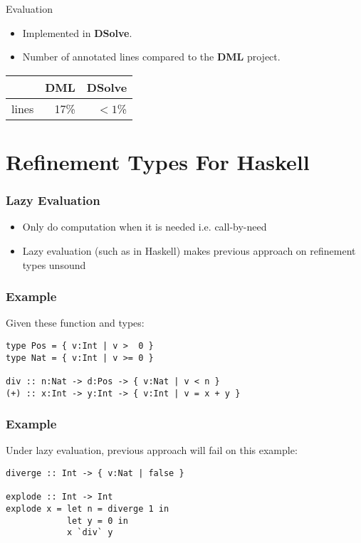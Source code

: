 \documentclass[pdf]{beamer}
\begin{document}
\begin{frame}{Evaluation}
  \begin{itemize}
    \item Implemented in \textbf{DSolve}.
    \item Number of annotated lines compared to the \textbf{DML} project.
  \end{itemize}
  \begin{table}
    \begin{tabular}{l|r|r}
            & \textbf{DML} & \textbf{DSolve}\\
      \hline
      lines & 17\%         & $< 1$\%
    \end{tabular}
  \end{table}
\end{frame}

\section{Refinement Types For Haskell}

\begin{frame}
  \frametitle{Lazy Evaluation}
  \begin{itemize}
    \item Only do computation when it is needed i.e. call-by-need
    \item Lazy evaluation (such as in Haskell) makes previous approach on
      refinement types unsound
  \end{itemize}
\end{frame}

\begin{frame}[fragile]
  \frametitle{Example}
  Given these function and types:
  \begin{verbatim}
type Pos = { v:Int | v >  0 }
type Nat = { v:Int | v >= 0 }

div :: n:Nat -> d:Pos -> { v:Nat | v < n } 
(+) :: x:Int -> y:Int -> { v:Int | v = x + y }
  \end{verbatim}
\end{frame}

\begin{frame}[fragile]
  \frametitle{Example}
  Under lazy evaluation, previous approach will fail on this example:
  \begin{verbatim}
diverge :: Int -> { v:Nat | false } 

explode :: Int -> Int
explode x = let n = diverge 1 in 
            let y = 0 in 
            x `div` y
  \end{verbatim}
\end{frame}
\end{document}
